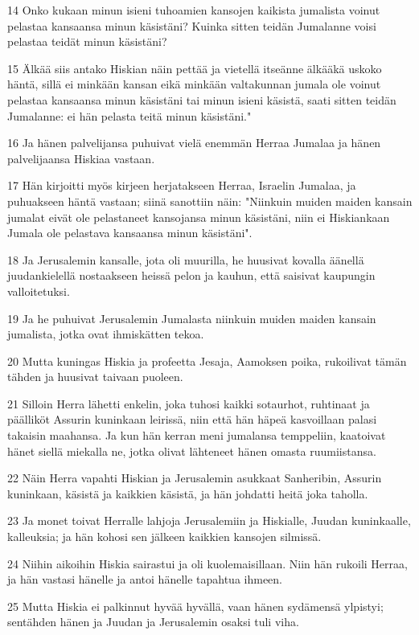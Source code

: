 \par 14 Onko kukaan minun isieni tuhoamien kansojen kaikista jumalista voinut pelastaa kansaansa minun käsistäni? Kuinka sitten teidän Jumalanne voisi pelastaa teidät minun käsistäni?
\par 15 Älkää siis antako Hiskian näin pettää ja vietellä itseänne älkääkä uskoko häntä, sillä ei minkään kansan eikä minkään valtakunnan jumala ole voinut pelastaa kansaansa minun käsistäni tai minun isieni käsistä, saati sitten teidän Jumalanne: ei hän pelasta teitä minun käsistäni."
\par 16 Ja hänen palvelijansa puhuivat vielä enemmän Herraa Jumalaa ja hänen palvelijaansa Hiskiaa vastaan.
\par 17 Hän kirjoitti myös kirjeen herjatakseen Herraa, Israelin Jumalaa, ja puhuakseen häntä vastaan; siinä sanottiin näin: "Niinkuin muiden maiden kansain jumalat eivät ole pelastaneet kansojansa minun käsistäni, niin ei Hiskiankaan Jumala ole pelastava kansaansa minun käsistäni".
\par 18 Ja Jerusalemin kansalle, jota oli muurilla, he huusivat kovalla äänellä juudankielellä nostaakseen heissä pelon ja kauhun, että saisivat kaupungin valloitetuksi.
\par 19 Ja he puhuivat Jerusalemin Jumalasta niinkuin muiden maiden kansain jumalista, jotka ovat ihmiskätten tekoa.
\par 20 Mutta kuningas Hiskia ja profeetta Jesaja, Aamoksen poika, rukoilivat tämän tähden ja huusivat taivaan puoleen.
\par 21 Silloin Herra lähetti enkelin, joka tuhosi kaikki sotaurhot, ruhtinaat ja päälliköt Assurin kuninkaan leirissä, niin että hän häpeä kasvoillaan palasi takaisin maahansa. Ja kun hän kerran meni jumalansa temppeliin, kaatoivat hänet siellä miekalla ne, jotka olivat lähteneet hänen omasta ruumiistansa.
\par 22 Näin Herra vapahti Hiskian ja Jerusalemin asukkaat Sanheribin, Assurin kuninkaan, käsistä ja kaikkien käsistä, ja hän johdatti heitä joka taholla.
\par 23 Ja monet toivat Herralle lahjoja Jerusalemiin ja Hiskialle, Juudan kuninkaalle, kalleuksia; ja hän kohosi sen jälkeen kaikkien kansojen silmissä.
\par 24 Niihin aikoihin Hiskia sairastui ja oli kuolemaisillaan. Niin hän rukoili Herraa, ja hän vastasi hänelle ja antoi hänelle tapahtua ihmeen.
\par 25 Mutta Hiskia ei palkinnut hyvää hyvällä, vaan hänen sydämensä ylpistyi; sentähden hänen ja Juudan ja Jerusalemin osaksi tuli viha.
